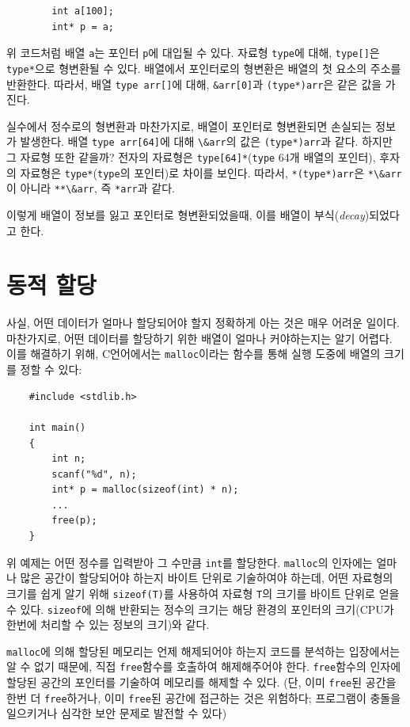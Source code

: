 \documentclass[a4paper,12pt]{book}
\newcommand{\V}[1]{\Verb|#1|}
\begin{document}
        \begin{lstlisting}
        int a[100];
        int* p = a;
        \end{lstlisting}

        위 코드처럼 배열 \V{a}는 포인터 \V{p}에 대입될 수 있다.
        자료형 \V{type}에 대해, \V{type[]}은 \V{type*}으로 형변환될 수 있다.
        배열에서 포인터로의 형변환은 배열의 첫 요소의 주소를 반환한다.
        따라서, 배열 \V{type arr[]}에 대해, \V{&arr[0]}과 \V{(type*)arr}은 같은 값을 가진다.

        실수에서 정수로의 형변환과 마찬가지로, 배열이 포인터로 형변환되면 손실되는 정보가 발생한다.
        배열 \V{type arr[64]}에 대해 \V{\&arr}의 값은 \V{(type*)arr}과 같다. 하지만 그 자료형 또한 같을까?
        전자의 자료형은 \V{type[64]*}(\V{type} 64개 배열의 포인터),
        후자의 자료형은 \V{type*}(\V{type}의 포인터)로 차이를 보인다.
        따라서, \V{*(type*)arr}은 \V{*\&arr}이 아니라 \V{**\&arr}, 즉 \V{*arr}과 같다.

        이렇게 배열이 정보를 잃고 포인터로 형변환되었을때,
        이를 배열이 부식(\textit{decay})되었다고 한다.

\section{동적 할당}

    사실, 어떤 데이터가 얼마나 할당되어야 할지 정확하게 아는 것은 매우 어려운 일이다.
    마찬가지로, 어떤 데이터를 할당하기 위한 배열이 얼마나 커야하는지는 알기 어렵다.
    이를 해결하기 위해, C언어에서는 \V{malloc}이라는 함수를 통해 실행 도중에 배열의 크기를 정할 수 있다:

    \begin{lstlisting}
    #include <stdlib.h>

    int main() 
    {
        int n;
        scanf("%d", n);
        int* p = malloc(sizeof(int) * n);
        ...
        free(p);
    }
    \end{lstlisting}

    위 예제는 어떤 정수를 입력받아 그 수만큼 \V{int}를 할당한다.
    \V{malloc}의 인자에는 얼마나 많은 공간이 할당되어야 하는지 바이트 단위로 기술하여야 하는데,
    어떤 자료형의 크기를 쉽게 알기 위해 \V{sizeof(T)}를 사용하여 자료형 \V{T}의 크기를 바이트 단위로 얻을 수 있다.
    \V{sizeof}에 의해 반환되는 정수의 크기는 해당 환경의 포인터의 크기(CPU가 한번에 처리할 수 있는 정보의 크기)와 같다.

    \V{malloc}에 의해 할당된 메모리는 언제 해제되어야 하는지 코드를 분석하는 입장에서는 알 수 없기 때문에,
    직접 \V{free}함수를 호출하여 해제해주어야 한다.
    \V{free}함수의 인자에 할당된 공간의 포인터를 기술하여 메모리를 해제할 수 있다.
    (단, 이미 \V{free}된 공간을 한번 더 \V{free}하거나, 이미 \V{free}된 공간에 접근하는 것은 위험하다;
    프로그램이 충돌을 일으키거나 심각한 보안 문제로 발전할 수 있다)
\end{document}
